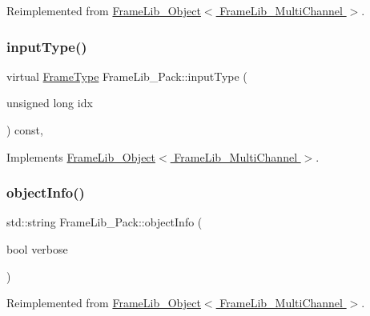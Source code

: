 Reimplemented from \hyperlink{class_frame_lib___object_a49abea5f18125c425b1eae8710735891}{Frame\+Lib\+\_\+\+Object$<$ Frame\+Lib\+\_\+\+Multi\+Channel $>$}.

\mbox{\label{class_frame_lib___pack_af516c48cb7d0e685c6572dbdd1377b66}} 
\subsubsection{\texorpdfstring{input\+Type()}{inputType()}}
{\footnotesize\ttfamily virtual \hyperlink{_frame_lib___types_8h_ad495a9f61af7fff07d7e97979d1ab854}{Frame\+Type} Frame\+Lib\+\_\+\+Pack\+::input\+Type (\begin{DoxyParamCaption}\item[{unsigned long}]{idx }\end{DoxyParamCaption}) const\hspace{0.3cm}{\ttfamily [inline]}, {\ttfamily [virtual]}}



Implements \hyperlink{class_frame_lib___object_ab1ab1ae8180bb8b7e881aac6a4e1066c}{Frame\+Lib\+\_\+\+Object$<$ Frame\+Lib\+\_\+\+Multi\+Channel $>$}.

\mbox{\label{class_frame_lib___pack_aa15c5f54847d99c3bd3f9c2cf7688fd2}} 
\subsubsection{\texorpdfstring{object\+Info()}{objectInfo()}}
{\footnotesize\ttfamily std\+::string Frame\+Lib\+\_\+\+Pack\+::object\+Info (\begin{DoxyParamCaption}\item[{bool}]{verbose }\end{DoxyParamCaption})\hspace{0.3cm}{\ttfamily [virtual]}}



Reimplemented from \hyperlink{class_frame_lib___object_a10d673de9a3c59ace6a22ba1cff313c8}{Frame\+Lib\+\_\+\+Object$<$ Frame\+Lib\+\_\+\+Multi\+Channel $>$}.

